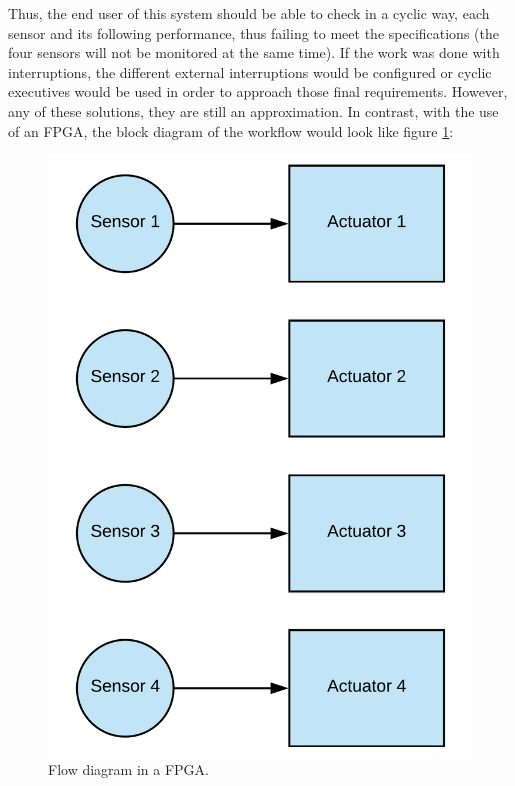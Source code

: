 Thus, the end user of this system should be able to check in a cyclic way, each sensor and its following performance, thus failing to meet the specifications (the four sensors will not be monitored at the same time).
If the work was done with interruptions, the different external interruptions would be configured or cyclic executives would be used in order to approach those final requirements. However, any of these solutions, they are still an approximation.\newline
In contrast, with the use of an FPGA, the block diagram of the workflow would look like figure \ref{fig:fpga_sensor}:

\begin{center}
	\begin{figure}[H]
		\center
		\includegraphics[trim = 0mm 0mm 0mm 0mm, clip,scale=0.3]{imagenes/EstadoArte/fpga_sensor.pdf}
		\caption{Flow diagram in a FPGA.}
		\label{fig:fpga_sensor}
	\end{figure}
\end{center} 


